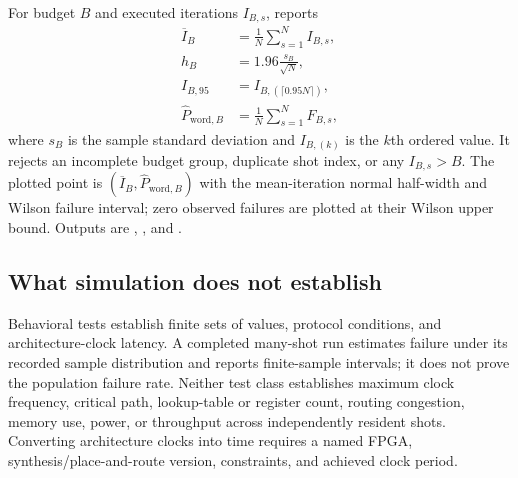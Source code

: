 \documentclass[10pt,conference]{IEEEtran}
\begin{document}
For budget $B$ and executed iterations $I_{B,s}$,
 reports
\begin{align}
 \overline I_B&=\frac1N\sum_{s=1}^{N}I_{B,s},\\
 h_B&=1.96\frac{s_B}{\sqrt N},\\
 I_{B,95}&=I_{B,(\lceil0.95N\rceil)},\\
 \widehat P_{\mathrm{word},B}&=\frac1N\sum_{s=1}^{N}F_{B,s},
 \label{eq:budget-metrics}
\end{align}
where $s_B$ is the sample standard deviation and $I_{B,(k)}$ is the $k$th
ordered value.  It rejects an incomplete budget group, duplicate shot index, or
any $I_{B,s}>B$.  The plotted point is
$(\overline I_B,\widehat P_{\mathrm{word},B})$ with the mean-iteration normal
half-width and Wilson failure interval; zero observed failures are plotted at
their Wilson upper bound.  Outputs are
, , and
.

\subsection{What simulation does not establish}
Behavioral tests establish finite sets of values, protocol conditions, and
architecture-clock latency.  A completed many-shot run estimates failure under
its recorded sample distribution and reports finite-sample intervals; it does
not prove the population failure rate.  Neither test class establishes maximum
clock frequency, critical path, lookup-table or register count, routing
congestion, memory use, power, or throughput across independently resident
shots.  Converting architecture clocks into time requires a named FPGA,
synthesis/place-and-route version, constraints, and achieved clock period.
\end{document}

